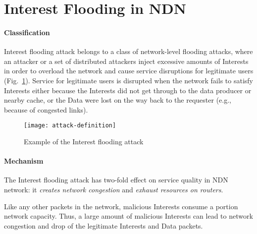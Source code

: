 \section{Interest Flooding in NDN}
\label{sec:interest flooding}



\paragraph{Classification}

Interest flooding attack belongs to a class of network-level flooding attacks, where an attacker or a set of distributed attackers inject excessive amounts of Interests in order to overload the network and cause service disruptions for legitimate users (Fig.~\ref{fig:flooding example}).
Service for legitimate users is disrupted when the network fails to satisfy Interests either because the Interests did not get through to the data producer or nearby cache, or the Data were lost on the way back to the requester (e.g., because of congested links).

\begin{figure}[htbp]
  \centering
  \texttt{[image: attack-definition]}
  \caption{Example of the Interest flooding attack}
  \label{fig:flooding example}
\end{figure}

\paragraph{Mechanism}

The Interest flooding attack has two-fold effect on service quality in NDN network: it \emph{creates network congestion} and \emph{exhaust resources on routers}.

Like any other packets in the network, malicious Interests consume a portion network capacity.
Thus, a large amount of malicious Interests can lead to network congestion and drop of the legitimate Interests and Data packets.

